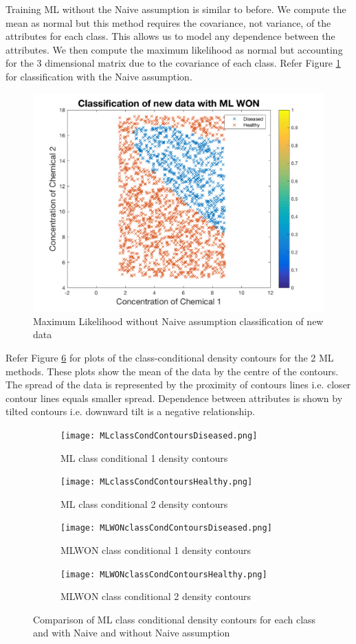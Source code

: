 Training ML without the Naive assumption is similar to before. We compute the mean as normal but this method requires the covariance, not variance, of the attributes for each class. This allows us to model any dependence between the attributes. We then compute the maximum likelihood as normal but accounting for the 3 dimensional matrix due to the covariance of each class. Refer Figure \ref{fig:MLWON} for classification with the Naive assumption.

\begin{figure}[h]
	\centering
	\includegraphics[width=0.8\linewidth]{images/MLWONnewData}
	\caption{Maximum Likelihood without Naive assumption classification of new data}
	\label{fig:MLWON}
\end{figure}

Refer Figure \ref{fig:CMLdens} for plots of the class-conditional density contours for the 2 ML methods. These plots show the mean of the data by the centre of the contours. The spread of the data is represented by the proximity of contours lines i.e. closer contour lines equals smaller spread. Dependence between attributes is shown by tilted contours i.e. downward tilt is a negative relationship.

\begin{figure}[h!] 
	\centering
	\begin{subfigure}[b]{.40\textwidth}
		\texttt{[image: MLclassCondContoursDiseased.png]}
		\caption{ML class conditional 1 density contours}
		\label{fig:cml1}
	\end{subfigure}
	\begin{subfigure}[b]{.40\textwidth}
		\texttt{[image: MLclassCondContoursHealthy.png]}
		\caption{ML class conditional 2 density contours}
		\label{fig:cml2}
	\end{subfigure}
	\begin{subfigure}[b]{.40\textwidth}
		\texttt{[image: MLWONclassCondContoursDiseased.png]}
		\caption{MLWON class conditional 1 density contours}
		\label{fig:cml3}
	\end{subfigure}
	\begin{subfigure}[b]{.40\textwidth}
		\texttt{[image: MLWONclassCondContoursHealthy.png]}
		\caption{MLWON class conditional 2 density contours}
		\label{fig:cml4}
	\end{subfigure}
	\caption{Comparison of ML class conditional density contours for each class and with Naive and without Naive assumption}
	\label{fig:CMLdens}
\end{figure}

